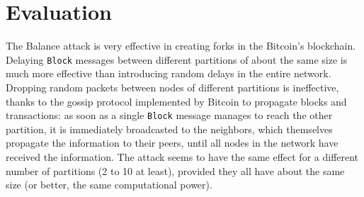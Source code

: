 \section{Evaluation}
The Balance attack is very effective in creating forks in the Bitcoin's blockchain.
Delaying \texttt{Block} messages between different partitions of about the same size is much more effective than introducing random delays in the entire network.
Dropping random packets between nodes of different partitions is ineffective, thanks to the gossip protocol implemented by Bitcoin to propagate blocks and transactions:
as soon as a single \texttt{Block} message manages to reach the other partition, it is immediately broadcasted to the neighbors, which themselves propagate the information to their peers, until all nodes in the network have received the information.
The attack seems to have the same effect for a different number of partitions (\num{2} to \num{10} at least), provided they all have about the same size (or better, the same computational power).
